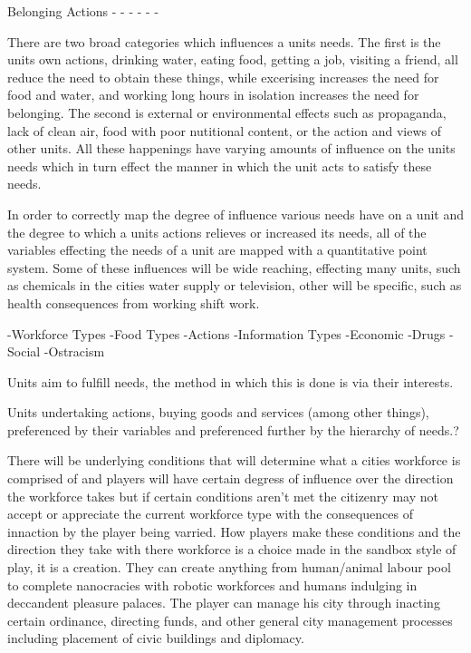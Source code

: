 Belonging Actions
-
-
-
-
-
-


There are two broad categories which influences a units needs. The first is the units own actions, drinking water, eating food, getting a job, visiting a friend, all reduce the need to obtain these things, while excerising increases the need for food and water, and working long hours in isolation increases the need for belonging. The second is external or environmental effects such as propaganda, lack of clean air, food with poor nutitional content, or the action and views of other units. All these happenings have varying amounts of influence on the units needs which in turn effect the manner in which the unit acts to satisfy these needs.

In order to correctly map the degree of influence various needs have on a unit and the degree to which a units actions relieves or increased its needs, all of the variables effecting the needs of a unit are mapped with a quantitative point system. Some of these influences will be wide reaching, effecting many units, such as chemicals in the cities water supply or television, other will be specific, such as health consequences from working shift work. 


-Workforce Types
-Food Types
-Actions
-Information Types
-Economic 
-Drugs
-Social
-Ostracism



%
%
%
%
%
%
%





Units aim to fulfill needs, the method in which this is done is via their interests.

Units undertaking actions, buying goods and services (among other things), preferenced by their variables and preferenced further by the hierarchy of needs.?



 



There will be underlying conditions that will determine what a cities workforce is comprised of and players will have certain degress of influence over the direction the workforce takes but if certain conditions aren't met the citizenry may not accept or appreciate the current workforce type with the consequences of innaction by the player being varried. How players make these conditions and the direction they take with there workforce is a choice made in the sandbox style of play, it is a creation. They can create anything from human/animal labour pool to complete nanocracies with robotic workforces and humans indulging in deccandent pleasure palaces. The player can manage his city through inacting certain ordinance, directing funds, and other general city management processes including placement of civic buildings and diplomacy. 
